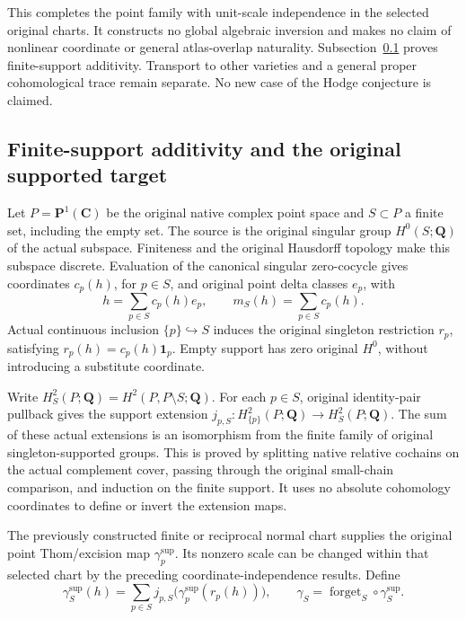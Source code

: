 \documentclass[11pt]{article}
\theoremstyle{definition}
\theoremstyle{remark}
\newcommand{\Q}{\mathbf Q}
\newcommand{\one}{\mathbf 1}
\begin{document}
This completes the point family with unit-scale independence in the
selected original charts. It constructs no global algebraic inversion
and makes no claim of nonlinear coordinate or general atlas-overlap
naturality. Subsection~\ref{subsec:p1-finite-support-gysin} proves
finite-support additivity. Transport to other varieties and a general
proper cohomological trace remain separate. No new case of the Hodge
conjecture is claimed.

\clearpage

\subsection{Finite-support additivity and the original supported target}
\label{subsec:p1-finite-support-gysin}

Let \(P=\mathbf P^1(\mathbf C)\) be the original native complex point
space and \(S\subset P\) a finite set, including the empty set. The
source is the original singular group \(H^0(S;\Q)\) of the actual
subspace. Finiteness and the original Hausdorff topology make this
subspace discrete. Evaluation of the canonical singular zero-cocycle
gives coordinates \(c_p(h)\), for \(p\in S\), and original point
delta classes \(e_p\), with
\[
 h=\sum_{p\in S}c_p(h)e_p,\qquad
 m_S(h)=\sum_{p\in S}c_p(h).
\]
Actual continuous inclusion \(\{p\}\hookrightarrow S\) induces
the original singleton restriction \(r_p\), satisfying
\(r_p(h)=c_p(h)\one_p\). Empty support has zero original \(H^0\),
without introducing a substitute coordinate.

Write \(H^2_S(P;\Q)=H^2(P,P\setminus S;\Q)\). For each
\(p\in S\), original identity-pair pullback gives the support
extension \(j_{p,S}:H^2_{\{p\}}(P;\Q)\to H^2_S(P;\Q)\).
The sum of these actual extensions is an isomorphism from the finite
family of original singleton-supported groups. This is proved by
splitting native relative cochains on the actual complement cover,
passing through the original small-chain comparison, and induction on
the finite support. It uses no absolute cohomology coordinates to
define or invert the extension maps.

The previously constructed finite or reciprocal normal chart supplies
the original point Thom/excision map \(\gamma_p^{\mathrm{sup}}\).
Its nonzero scale can be changed within that selected chart by the
preceding coordinate-independence results. Define
\[
 \gamma_S^{\mathrm{sup}}(h)
   =\sum_{p\in S}j_{p,S}\bigl(
          \gamma_p^{\mathrm{sup}}(r_p(h))\bigr),
 \qquad
 \gamma_S=\operatorname{forget}_S\circ\gamma_S^{\mathrm{sup}}.
\]
\end{document}
